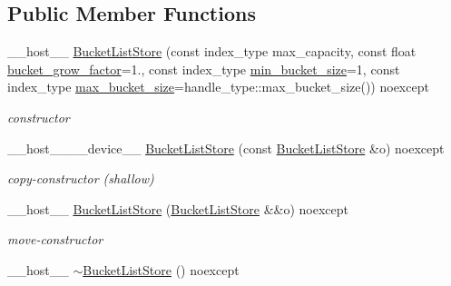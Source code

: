 \subsection*{Public Member Functions}
\begin{DoxyCompactItemize}
\item 
\+\_\+\+\_\+host\+\_\+\+\_\+ \hyperlink{classwarpcore_1_1storage_1_1multi__value_1_1BucketListStore_a9dd3b0501fb07b36747b6a68b7ce49ba}{Bucket\+List\+Store} (const index\+\_\+type max\+\_\+capacity, const float \hyperlink{classwarpcore_1_1storage_1_1multi__value_1_1BucketListStore_aec5200166b68b8b852ad51f908904f2c}{bucket\+\_\+grow\+\_\+factor}=1., const index\+\_\+type \hyperlink{classwarpcore_1_1storage_1_1multi__value_1_1BucketListStore_aa4dd16de3f389257c0e7a75b807c2c52}{min\+\_\+bucket\+\_\+size}=1, const index\+\_\+type \hyperlink{classwarpcore_1_1storage_1_1multi__value_1_1BucketListStore_aa3160abbdf2196314e3cd0e2e2d5a47a}{max\+\_\+bucket\+\_\+size}=handle\+\_\+type\+::max\+\_\+bucket\+\_\+size()) noexcept
\begin{DoxyCompactList}\small\item\em constructor \end{DoxyCompactList}\item 
\+\_\+\+\_\+host\+\_\+\+\_\+\+\_\+\+\_\+device\+\_\+\+\_\+ \hyperlink{classwarpcore_1_1storage_1_1multi__value_1_1BucketListStore_a5ae79afa0a3138946bd2115e77220683}{Bucket\+List\+Store} (const \hyperlink{classwarpcore_1_1storage_1_1multi__value_1_1BucketListStore}{Bucket\+List\+Store} \&o) noexcept
\begin{DoxyCompactList}\small\item\em copy-\/constructor (shallow) \end{DoxyCompactList}\item 
\+\_\+\+\_\+host\+\_\+\+\_\+ \hyperlink{classwarpcore_1_1storage_1_1multi__value_1_1BucketListStore_a748b69237fae7c882ceec0091d330f91}{Bucket\+List\+Store} (\hyperlink{classwarpcore_1_1storage_1_1multi__value_1_1BucketListStore}{Bucket\+List\+Store} \&\&o) noexcept
\begin{DoxyCompactList}\small\item\em move-\/constructor \end{DoxyCompactList}\item 
\mbox{\label{classwarpcore_1_1storage_1_1multi__value_1_1BucketListStore_ae9da5dc958378c8dd5aea4095a4df736}} 
\+\_\+\+\_\+host\+\_\+\+\_\+ \hyperlink{classwarpcore_1_1storage_1_1multi__value_1_1BucketListStore_ae9da5dc958378c8dd5aea4095a4df736}{$\sim$\+Bucket\+List\+Store} () noexcept

\end{DoxyCompactItemize}
